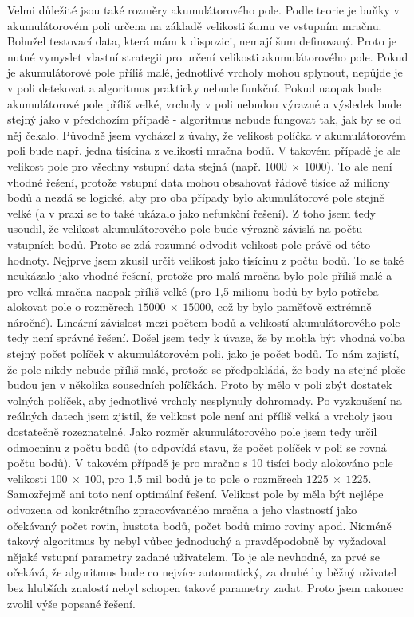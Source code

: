 \documentclass[11pt,twoside,a4paper]{book}
\begin{document}
Velmi důležité jsou také rozměry akumulátorového pole. Podle teorie je buňky v akumulátorovém poli určena na základě velikosti šumu ve vstupním mračnu. Bohužel testovací data, která mám k dispozici, nemají šum definovaný. Proto je nutné vymyslet vlastní strategii pro určení velikosti akumulátorového pole. Pokud je akumulátorové pole příliš malé, jednotlivé vrcholy mohou splynout, nepůjde je v poli detekovat a algoritmus prakticky nebude funkční. Pokud naopak bude akumulátorové pole příliš velké, vrcholy v poli nebudou výrazné a výsledek bude stejný jako v předchozím případě - algoritmus nebude fungovat tak, jak by se od něj čekalo. Původně jsem vycházel z úvahy, že velikost políčka v akumulátorovém poli bude např. jedna tisícina z velikosti mračna bodů. V takovém případě je ale velikost pole pro všechny vstupní data stejná (např. $1000~\times~1000$). To ale není vhodné řešení, protože vstupní data mohou obsahovat řádově tisíce až miliony bodů a nezdá se logické, aby pro oba případy bylo akumulátorové pole stejně velké (a v praxi se to také ukázalo jako nefunkční řešení). Z toho jsem tedy usoudil, že velikost akumulátorového pole bude výrazně závislá na počtu vstupních bodů. Proto se zdá rozumné odvodit velikost pole právě od této hodnoty. Nejprve jsem zkusil určit velikost jako tisícinu z počtu bodů. To se také neukázalo jako vhodné řešení, protože pro malá mračna bylo pole příliš malé a pro velká mračna naopak příliš velké (pro 1,5 milionu bodů by bylo potřeba alokovat pole o rozměrech $15000~\times~15000$, což by bylo paměťově extrémně náročné). Lineární závislost mezi počtem bodů a velikostí akumulátorového pole tedy není správné řešení. Došel jsem tedy k úvaze, že by mohla být vhodná volba stejný počet políček v akumulátorovém poli, jako je počet bodů. To nám zajistí, že pole nikdy nebude příliš malé, protože se předpokládá, že body na stejné ploše budou jen v několika sousedních políčkách. Proto by mělo v poli zbýt dostatek volných políček, aby jednotlivé vrcholy nesplynuly dohromady. Po vyzkoušení na reálných datech jsem zjistil, že velikost pole není ani příliš velká a vrcholy jsou dostatečně rozeznatelné. Jako rozměr akumulátorového pole jsem tedy určil odmocninu z počtu bodů (to odpovídá stavu, že počet políček v poli se rovná počtu bodů). V takovém případě je pro mračno s 10 tisíci body alokováno pole velikosti $100~\times~100$, pro 1,5 mil bodů je to pole o rozměrech $1225~\times~1225$. Samozřejmě ani toto není optimální řešení. Velikost pole by měla být nejlépe odvozena od konkrétního zpracovávaného mračna a jeho vlastností jako očekávaný počet rovin, hustota bodů, počet bodů mimo roviny apod. Nicméně takový algoritmus by nebyl vůbec jednoduchý a pravděpodobně by vyžadoval nějaké vstupní parametry zadané uživatelem. To je ale nevhodné, za prvé se očekává, že algoritmus bude co nejvíce automatický, za druhé by běžný uživatel bez hlubších znalostí nebyl schopen takové parametry zadat. Proto jsem nakonec zvolil výše popsané řešení.
\end{document}
